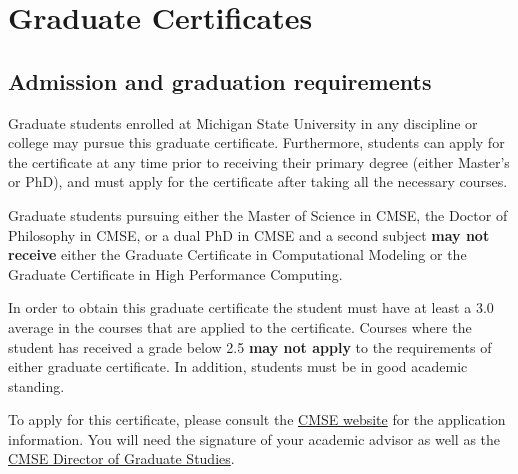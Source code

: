 \section{Graduate Certificates}
\label{sec:grad_certs}

\subsection{Admission and graduation requirements}
\label{sec:cert_requirements}

Graduate students enrolled at Michigan State University in any
discipline or college may pursue this graduate certificate.
Furthermore, students can apply for the certificate at any time prior
to receiving their primary degree (either Master’s or PhD), and must
apply for the certificate after taking all the necessary courses.

Graduate students pursuing either the Master of Science in CMSE, the
Doctor of Philosophy in CMSE, or a dual PhD in CMSE and a second
subject \textbf{may not  receive} either the Graduate Certificate in
Computational Modeling or the Graduate Certificate in High Performance
Computing.

In order to obtain this graduate certificate the student must have at
least a 3.0 average in the courses that are applied to the
certificate.  Courses where the student has received a grade below 2.5
\textbf{may not apply} to the requirements of either graduate
certificate.  In addition, students must be in good academic standing.

To apply for this certificate, please consult the
\href{https://cmse.msu.edu/academics/graduate-program/}{CMSE website}
for the application information.  You will need the signature of your
academic advisor as well as the \href{mailto:cmsegrad@msu.edu}{CMSE
Director of Graduate Studies}.





